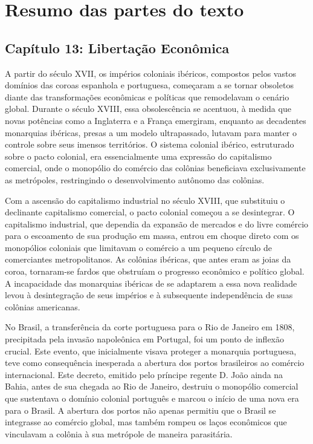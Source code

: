 \documentclass[a4paper,12pt]{article}[abntex2]
\begin{document}
\newpage

\section{\textbf{Resumo das partes do texto}}
\subsection{\textbf{Capítulo 13: Libertação Econômica}}

A partir do século XVII, os impérios coloniais ibéricos, compostos pelos vastos domínios das coroas espanhola e portuguesa, começaram a se tornar obsoletos diante das transformações econômicas e políticas que remodelavam o cenário global. Durante o século XVIII, essa obsolescência se acentuou, à medida que novas potências como a Inglaterra e a França emergiram, enquanto as decadentes monarquias ibéricas, presas a um modelo ultrapassado, lutavam para manter o controle sobre seus imensos territórios. O sistema colonial ibérico, estruturado sobre o pacto colonial, era essencialmente uma expressão do capitalismo comercial, onde o monopólio do comércio das colônias beneficiava exclusivamente as metrópoles, restringindo o desenvolvimento autônomo das colônias.

Com a ascensão do capitalismo industrial no século XVIII, que substituiu o declinante capitalismo comercial, o pacto colonial começou a se desintegrar. O capitalismo industrial, que dependia da expansão de mercados e do livre comércio para o escoamento de sua produção em massa, entrou em choque direto com os monopólios coloniais que limitavam o comércio a um pequeno círculo de comerciantes metropolitanos. As colônias ibéricas, que antes eram as joias da coroa, tornaram-se fardos que obstruíam o progresso econômico e político global. A incapacidade das monarquias ibéricas de se adaptarem a essa nova realidade levou à desintegração de seus impérios e à subsequente independência de suas colônias americanas.

No Brasil, a transferência da corte portuguesa para o Rio de Janeiro em 1808, precipitada pela invasão napoleônica em Portugal, foi um ponto de inflexão crucial. Este evento, que inicialmente visava proteger a monarquia portuguesa, teve como consequência inesperada a abertura dos portos brasileiros ao comércio internacional. Este decreto, emitido pelo príncipe regente D. João ainda na Bahia, antes de sua chegada ao Rio de Janeiro, destruiu o monopólio comercial que sustentava o domínio colonial português e marcou o início de uma nova era para o Brasil. A abertura dos portos não apenas permitiu que o Brasil se integrasse ao comércio global, mas também rompeu os laços econômicos que vinculavam a colônia à sua metrópole de maneira parasitária.
\end{document}
